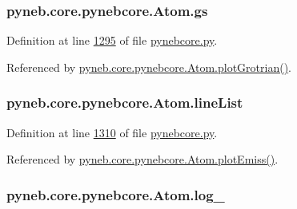 \hypertarget{classpyneb_1_1core_1_1pynebcore_1_1_atom_a3e6bcb66f905475145b261ae797096e3}{
\subsubsection[{gs}]{\setlength{\rightskip}{0pt plus 5cm}pyneb.\-core.\-pynebcore.\-Atom.\-gs}}\label{classpyneb_1_1core_1_1pynebcore_1_1_atom_a3e6bcb66f905475145b261ae797096e3}


Definition at line \hyperlink{pynebcore_8py_source_l01295}{1295} of file \hyperlink{pynebcore_8py_source}{pynebcore.\-py}.



Referenced by \hyperlink{pynebcore_8py_source_l02443}{pyneb.\-core.\-pynebcore.\-Atom.\-plot\-Grotrian()}.

\hypertarget{classpyneb_1_1core_1_1pynebcore_1_1_atom_a8280ef5632977a7cf7e8fe4c63127703}{
\subsubsection[{line\-List}]{\setlength{\rightskip}{0pt plus 5cm}pyneb.\-core.\-pynebcore.\-Atom.\-line\-List}}\label{classpyneb_1_1core_1_1pynebcore_1_1_atom_a8280ef5632977a7cf7e8fe4c63127703}


Definition at line \hyperlink{pynebcore_8py_source_l01310}{1310} of file \hyperlink{pynebcore_8py_source}{pynebcore.\-py}.



Referenced by \hyperlink{pynebcore_8py_source_l02384}{pyneb.\-core.\-pynebcore.\-Atom.\-plot\-Emiss()}.

\hypertarget{classpyneb_1_1core_1_1pynebcore_1_1_atom_a9e2e5b5402bb9cf14c1b08684bccbf6b}{
\subsubsection[{log\-\_\-}]{\setlength{\rightskip}{0pt plus 5cm}pyneb.\-core.\-pynebcore.\-Atom.\-log\-\_\-}}\label{classpyneb_1_1core_1_1pynebcore_1_1_atom_a9e2e5b5402bb9cf14c1b08684bccbf6b}


